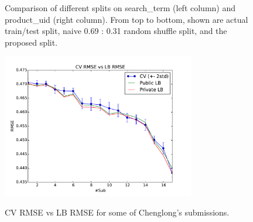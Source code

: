 \documentclass[12pt]{article}
\begin{document}
{{\begin{figure}[!htp]
    \caption{Comparison of different splits on search\_term (left column) and product\_uid (right column). From top to bottom, shown are actual train/test split, naive 0.69 : 0.31 random shuffle split, and the proposed split.}
    \label{Fig:Splitter}
\end{figure}

\begin{figure}
  \centering
  \includegraphics[width=0.75\textwidth]{../Fig/CV_LB_Chenglong.pdf}\\
  \caption{CV RMSE vs LB RMSE for some of Chenglong's submissions.}
  \label{Fig:CV_LB_Chenglong}
\end{figure}

}}
\end{document}
